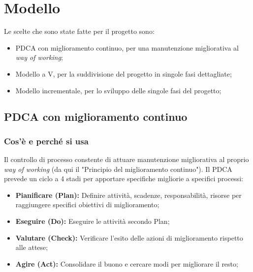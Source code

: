 \chapter{Modello}
Le scelte che sono state fatte per il progetto sono:
\begin{itemize}
    \item PDCA con miglioramento continuo, per una manutenzione migliorativa al {\it{way of working}};
    \item Modello a V, per la suddivisione del progetto in singole fasi dettagliate;
    \item Modello incrementale, per lo sviluppo delle singole fasi del progetto;
\end{itemize}

\section{PDCA con miglioramento continuo}
\subsection{Cos'è e perché si usa}
Il controllo di processo constente di attuare manutenzione migliorativa al proprio {\it{way of working}} (da qui il "Principio del miglioramento continuo"). Il PDCA prevede un ciclo a 4 stadi per apportare specifiche migliorie a specifici processi:
\begin{itemize}
    \item \textbf{Pianificare (Plan):} Definire attività, scadenze, responsabilità, risorse per raggiungere
    specifici obiettivi di miglioramento; 
    \item \textbf{Eseguire (Do):} Eseguire le attività secondo Plan; 
    \item \textbf{Valutare (Check):} Verificare l’esito delle azioni di miglioramento rispetto alle attese;
    \item \textbf{Agire (Act):} Consolidare il buono e cercare modi per migliorare il resto;
\end{itemize}
